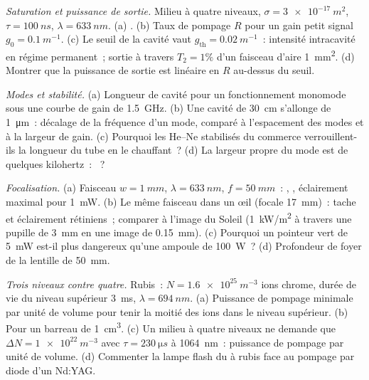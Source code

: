 \begin{exercise}[$\star\star$]\label{exo:b2:laser:6}
\emph{Saturation et puissance de sortie.} Milieu à quatre niveaux, $\sigma =
\qty{3e-17}{m^2}$, $\tau = \qty{100}{ns}$, $\lambda = \qty{633}{nm}$.
(a) . (b) Taux de pompage $R$ pour un gain petit signal
$g_0 = \qty{0.1}{m^{-1}}$. (c) Le seuil de la cavité vaut
$g_{\text{th}} = \qty{0.02}{m^{-1}}$~: intensité intracavité en régime
permanent~; sortie à travers $T_2 = 1\%$ d'un faisceau d'aire \qty{1}{mm^2}.
(d) Montrer que la puissance de sortie est linéaire en $R$ au-dessus du seuil.
\end{exercise}

\begin{exercise}[$\star\star$]\label{exo:b2:laser:7}
\emph{Modes et stabilité.} (a) Longueur de cavité pour un fonctionnement monomode
sous une courbe de gain de \qty{1.5}{GHz}. (b) Une cavité de \qty{30}{cm} s'allonge
de \qty{1}{\micro m}~: décalage de la fréquence d'un mode, comparé à
l'espacement des modes et à la largeur de gain. (c) Pourquoi les He--Ne stabilisés
du commerce verrouillent-ils la longueur du tube en le chauffant~? (d) La largeur propre du mode est
de quelques kilohertz~: ~?
\end{exercise}

\begin{exercise}[$\star\star$]\label{exo:b2:laser:8}
\emph{Focalisation.} (a) Faisceau $w = \qty{1}{mm}$, $\lambda = \qty{633}{nm}$,
$f = \qty{50}{mm}$~: , , éclairement maximal pour
\qty{1}{mW}. (b) Le même faisceau dans un œil (focale \qty{17}{mm})~:
tache et éclairement rétiniens~; comparer à l'image du Soleil
(\qty{1}{kW/m^2} à travers une pupille de \qty{3}{mm} en une image de \qty{0.15}{mm}).
(c) Pourquoi un pointeur vert de \qty{5}{mW} est-il plus dangereux qu'une
ampoule de \qty{100}{W}~? (d) Profondeur de foyer de la lentille de \qty{50}{mm}.
\end{exercise}

\begin{exercise}[$\star\star$]\label{exo:b2:laser:9}
\emph{Trois niveaux contre quatre.} Rubis~: $N = \qty{1.6e25}{m^{-3}}$
ions chrome, durée de vie du niveau supérieur \qty{3}{ms}, $\lambda =
\qty{694}{nm}$. (a) Puissance de pompage minimale par unité de volume pour tenir la moitié des
ions dans le niveau supérieur. (b) Pour un barreau de \qty{1}{cm^3}. (c) Un milieu à quatre
niveaux ne demande que $\Delta N = \qty{1e22}{m^{-3}}$ avec $\tau =
\qty{230}{\micro s}$ à \qty{1064}{nm}~: puissance de pompage par unité de volume. (d) Commenter la
lampe flash du  à rubis face au pompage par diode d'un Nd:YAG.
\end{exercise}


